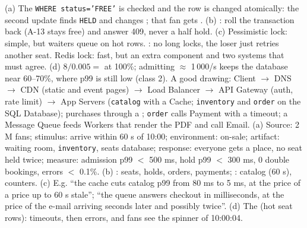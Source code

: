 (a) The \texttt{WHERE status='FREE'} is checked and the row is changed atomically: the second update finds \texttt{HELD} and changes ; that fan gets . (b) : roll the transaction back (A-13 stays free) and answer 409, never a half hold. (c) Pessimistic lock: simple, but waiters queue on hot rows. : no long locks, the loser just retries another seat. Redis lock: fast, but an extra component and two systems that must agree. (d) $8 / 0.005 =$  at 100\%; admitting $\approx$ 1\,000/s keeps the database near 60--70\%, where p99 is still low (class 2).
 A good drawing: Client $\to$ DNS $\to$ CDN (static and event pages) $\to$ Load Balancer $\to$ API Gateway (auth, rate limit) $\to$ App Servers (\texttt{catalog} with a Cache; \texttt{inventory} and \texttt{order} on the SQL Database); purchases through a ; \texttt{order} calls Payment with a timeout; a Message Queue feeds Workers that render the PDF and call Email. (a) Source: 2 M fans; stimulus: arrive within 60 s of 10:00; environment: on-sale; artifact: waiting room, \texttt{inventory}, seats database; response: everyone gets a place, no seat held twice; measure: admission p99 $<$ 500 ms, hold p99 $<$ 300 ms, 0 double bookings, errors $<$ 0.1\%. (b) : seats, holds, orders, payments; : catalog (60 s), counters. (c) E.g. ``the cache cuts catalog p99 from 80 ms to 5 ms, at the price of a price up to 60 s stale''; ``the queue answers checkout in milliseconds, at the price of the e-mail arriving seconds later and possibly twice''. (d) The  (hot seat rows): timeouts, then errors, and fans see the spinner of 10:00:04.
